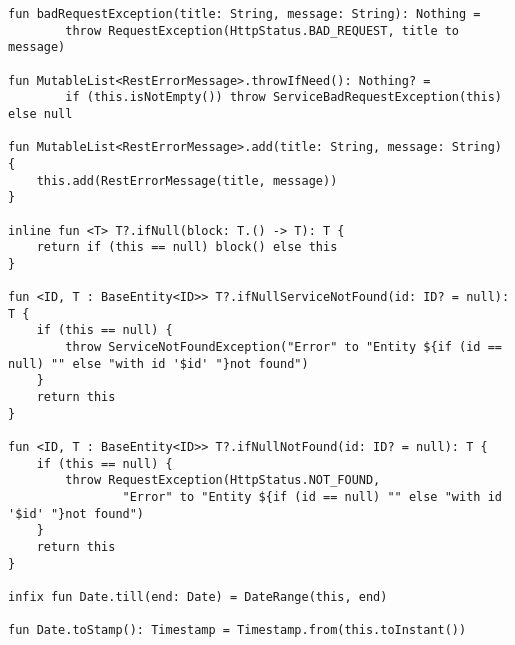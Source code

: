 \begin{lstlisting}[style = ktstyle]
fun badRequestException(title: String, message: String): Nothing =
        throw RequestException(HttpStatus.BAD_REQUEST, title to message)

fun MutableList<RestErrorMessage>.throwIfNeed(): Nothing? =
        if (this.isNotEmpty()) throw ServiceBadRequestException(this) else null

fun MutableList<RestErrorMessage>.add(title: String, message: String) {
    this.add(RestErrorMessage(title, message))
}

inline fun <T> T?.ifNull(block: T.() -> T): T {
    return if (this == null) block() else this
}

fun <ID, T : BaseEntity<ID>> T?.ifNullServiceNotFound(id: ID? = null): T {
    if (this == null) {
        throw ServiceNotFoundException("Error" to "Entity ${if (id == null) "" else "with id '$id' "}not found")
    }
    return this
}

fun <ID, T : BaseEntity<ID>> T?.ifNullNotFound(id: ID? = null): T {
    if (this == null) {
        throw RequestException(HttpStatus.NOT_FOUND,
                "Error" to "Entity ${if (id == null) "" else "with id '$id' "}not found")
    }
    return this
}

infix fun Date.till(end: Date) = DateRange(this, end)

fun Date.toStamp(): Timestamp = Timestamp.from(this.toInstant())


\end{lstlisting}